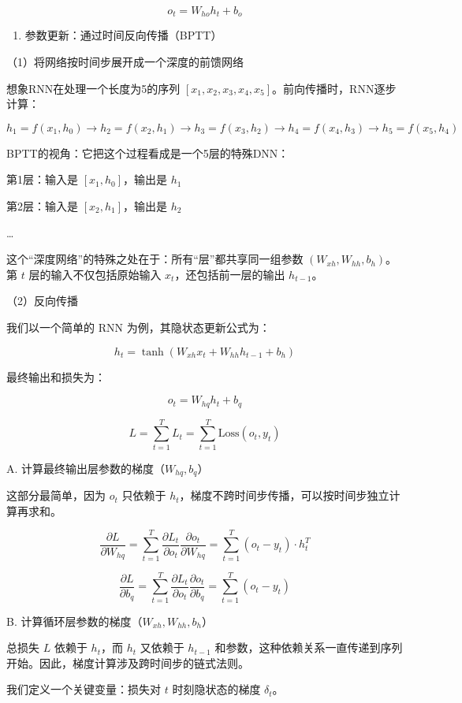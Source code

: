 \[
o_t=W_{ho}h_t+b_o
\]

\begin{enumerate}
\def\labelenumi{\arabic{enumi}.}
\setcounter{enumi}{2}
\tightlist
\item
  参数更新：通过时间反向传播（BPTT）
\end{enumerate}

（1）将网络按时间步展开成一个深度的前馈网络

想象RNN在处理一个长度为5的序列 \([x_1,x_2,x_3,x_4,x_5]\)。前向传播时，RNN逐步计算：

\[
h_1=f(x_1,h_0)\to h_2=f(x_2,h_1)\to h_3=f(x_3,h_2)\to h_4=f(x_4,h_3)\to h_5=f(x_5,h_4)
\]

BPTT的视角：它把这个过程看成是一个5层的特殊DNN：

第1层：输入是 \([x_1,h_0]\)，输出是 \(h_1\)

第2层：输入是 \([x_2,h_1]\)，输出是 \(h_2\)

\ldots{}

这个``深度网络''的特殊之处在于：所有``层''都共享同一组参数 \((W_{xh}, W_{hh}, b_h)\)。第 \(t\) 层的输入不仅包括原始输入 \(x_t\)，还包括前一层的输出 \(h_{t-1}\)。

（2）反向传播

我们以一个简单的 RNN 为例，其隐状态更新公式为：

\[
h_t = \tanh(W_{xh}x_t + W_{hh}h_{t-1} + b_h)
\]

最终输出和损失为：

\[
o_t = W_{hq}h_t + b_q
\]

\[
L = \sum_{t=1}^{T} L_t = \sum_{t=1}^{T} \mathrm{Loss}(o_t, y_t)
\]

A. 计算最终输出层参数的梯度（\(W_{hq}, b_q\)）

这部分最简单，因为 \(o_t\) 只依赖于 \(h_t\)，梯度不跨时间步传播，可以按时间步独立计算再求和。

\[
\frac{\partial L}{\partial W_{hq}}
= \sum_{t=1}^{T} \frac{\partial L_t}{\partial o_t}\frac{\partial o_t}{\partial W_{hq}}
= \sum_{t=1}^{T}(o_t - y_t) \cdot h_t^T
\]

\[
\frac{\partial L}{\partial b_q}
= \sum_{t=1}^{T} \frac{\partial L_t}{\partial o_t}\frac{\partial o_t}{\partial b_q}
= \sum_{t=1}^{T}(o_t - y_t)
\]

B. 计算循环层参数的梯度（\(W_{xh}, W_{hh}, b_h\)）

总损失 \(L\) 依赖于 \(h_t\)，而 \(h_t\) 又依赖于 \(h_{t-1}\) 和参数，这种依赖关系一直传递到序列开始。因此，梯度计算涉及跨时间步的链式法则。

我们定义一个关键变量：损失对 \(t\) 时刻隐状态的梯度 \(\delta_t\)。

